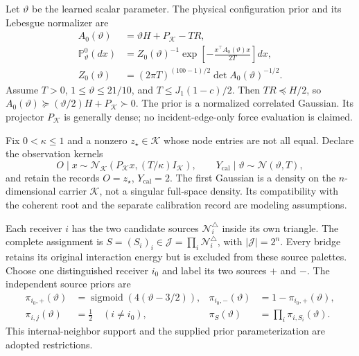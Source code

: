 Let \(\vartheta\) be the learned scalar parameter. The physical
configuration prior and its Lebesgue normalizer are
\begin{equation}
\begin{aligned}
A_0(\vartheta)&=\vartheta H+P_{\mathcal K}-TR,\\
\mathbb P^0_\vartheta(dx)
&=Z_0(\vartheta)^{-1}
  \exp\left[-\frac{x^\top A_0(\vartheta)x}{2T}\right]dx,\\
Z_0(\vartheta)&=(2\pi T)^{(10b-1)/2}
  \det A_0(\vartheta)^{-1/2}.
\end{aligned}
\label{eq:rg-formation-physical-prior}
\end{equation}
Assume \(T>0\), \(1\le\vartheta\le21/10\), and
\(T\le J_1(1-c)/2\). Then \(TR\preceq H/2\), so
\(A_0(\vartheta)\succeq(\vartheta/2)H+P_{\mathcal K}\succ0\).
The prior is a normalized correlated Gaussian. Its projector
\(P_{\mathcal K}\) is generally dense; no incident-edge-only force
evaluation is claimed. 

Fix \(0<\kappa\le1\) and a nonzero \(z_\star\in\mathcal K\) whose
node entries are not all equal. Declare the observation kernels
\begin{equation}
O\mid x\sim
  \mathcal N_{\mathcal K}(P_{\mathcal K}x,(T/\kappa)I_{\mathcal K}),
\qquad
Y_{\mathrm{cal}}\mid\vartheta\sim\mathcal N(\vartheta,T),
\label{eq:rg-formation-observation-kernels}
\end{equation}
and retain the records \(O=z_\star\), \(Y_{\mathrm{cal}}=2\).
The first Gaussian is a density on the \(n\)-dimensional carrier
\(\mathcal K\), not a singular full-space density. Its compatibility
with the coherent root and the separate calibration record are modeling
assumptions. 

Each receiver \(i\) has the two candidate sources
\(\mathcal N_i^\triangle\) inside its own triangle. The complete
assignment is \(S=(S_i)_i\in\mathcal J=\prod_i\mathcal N_i^\triangle\),
with \(|\mathcal J|=2^n\). Every bridge retains its original interaction
energy but is excluded from these source palettes. Choose one
distinguished receiver \(i_0\) and label its two sources \(+\) and
\(-\). The independent source priors are
\begin{equation}
\begin{aligned}
\pi_{i_0,+}(\vartheta)
  &=\operatorname{sigmoid}(4(\vartheta-3/2)),&
\pi_{i_0,-}(\vartheta)&=1-\pi_{i_0,+}(\vartheta),\\
\pi_{i,j}(\vartheta)&=\tfrac12\quad(i\ne i_0),&
\pi_S(\vartheta)&=\prod_i\pi_{i,S_i}(\vartheta).
\end{aligned}
\label{eq:rg-formation-source-priors}
\end{equation}
This internal-neighbor support and the supplied prior parameterization
are adopted restrictions. 

